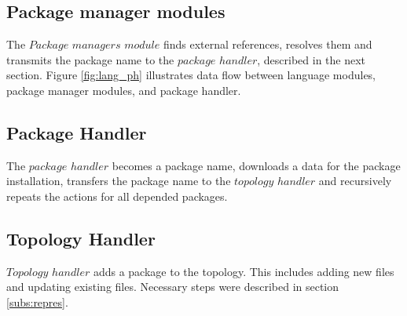 \subsection{Package manager modules} \label{subs:archpmm}
The $Package$ $managers$ $module$ finds external references, resolves them and transmits the package name to the $package$ $handler$, described in the next section.
Figure \ref{fig:lang_ph} illustrates data flow between language modules, package manager modules, and package handler.


\subsection{Package Handler} \label{subs:archph}
The $package$ $handler$ becomes a package name, downloads a data for the package installation, transfers the package name to the $topology$ $handler$ and recursively repeats the actions for all depended packages.

\subsection{Topology Handler} \label{subs:archtop}
$Topology$ $handler$ adds a package to the topology. 
This includes adding new files and updating existing files. 
Necessary steps were described in section \ref{subs:repres}.